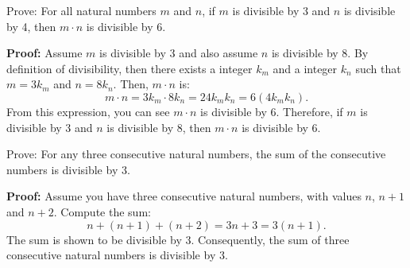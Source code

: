 \documentclass[11pt,addpoints]{exam}
\begin{document}
\begin{questions}
\fi

\question[8] Prove: For all natural numbers $m$ and $n$, if $m$ is divisible by 3 and $n$ is divisible by 4, then $m\cdot n$ is divisible by 6.
    \ifprintanswers
        \vspace{-10pt}
    \fi
	\begin{solution} \textbf{Proof:} Assume $m$ is divisible by 3 and also assume $n$ is divisible by 8.  By definition of divisibility, then there exists a integer $k_m$ and a integer $k_n$ such that $m = 3k_m$ and $n=8k_n$.  Then, $m\cdot n$ is:
	  \[ m\cdot n = 3k_m \cdot 8k_n = 24k_mk_n = 6(4k_mk_n). \]
	From this expression, you can see $m\cdot n$ is divisible by 6.  Therefore, if $m$ is divisible by 3 and $n$ is divisible by 8, then $m \cdot n$ is divisible by 6.
	\end{solution}




\question[8] Prove: For any three consecutive natural numbers, the sum of the consecutive numbers is divisible by 3.
    \ifprintanswers
        \vspace{-10pt}
    \fi
	\begin{solution} \textbf{Proof:} Assume you have three consecutive natural numbers, with values $n$, $n+1$ and $n+2$.  Compute the sum:
	  \[ n + (n+1) + (n+2) = 3n+3 = 3(n+1). \]
	The sum is shown to be divisible by 3.  Consequently, the sum of three consecutive natural numbers is divisible by 3.
	\end{solution}



\end{questions}
\end{document}
